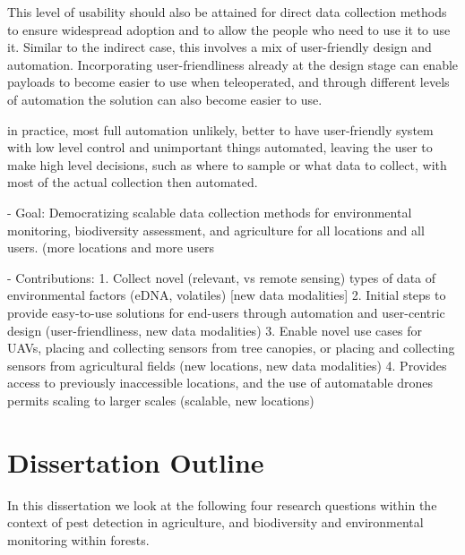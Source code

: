 This level of usability should also be attained for direct data collection methods to ensure widespread adoption and to allow the people who need to use it to use it. Similar to the indirect case, this involves a mix of user-friendly design and automation. Incorporating user-friendliness already at the design stage can enable payloads to become easier to use when teleoperated, and through different levels of automation the solution can also become easier to use. 

in practice, most full automation unlikely, better to have user-friendly system with low level control and unimportant things automated, leaving the user to make high level decisions, such as where to sample or what data to collect, with most of the actual collection then automated.


- Goal: Democratizing scalable data collection methods for environmental monitoring, biodiversity assessment, and agriculture for all locations and all users. (more locations and more users

- Contributions:
1. Collect novel (relevant, vs remote sensing) types of data of environmental factors (eDNA, volatiles) [new data modalities]
2. Initial steps to provide easy-to-use solutions for end-users through automation and user-centric design  (user-friendliness, new data modalities)
3. Enable novel use cases for UAVs, placing and collecting sensors from tree canopies, or placing and collecting sensors from agricultural fields (new locations, new data modalities)
4. Provides access to previously inaccessible locations, and the use of automatable drones permits scaling to larger scales (scalable, new locations)

\section{Dissertation Outline}
%
In this dissertation we look at the following four research questions within the context of pest detection in agriculture, and biodiversity and environmental monitoring within forests.

